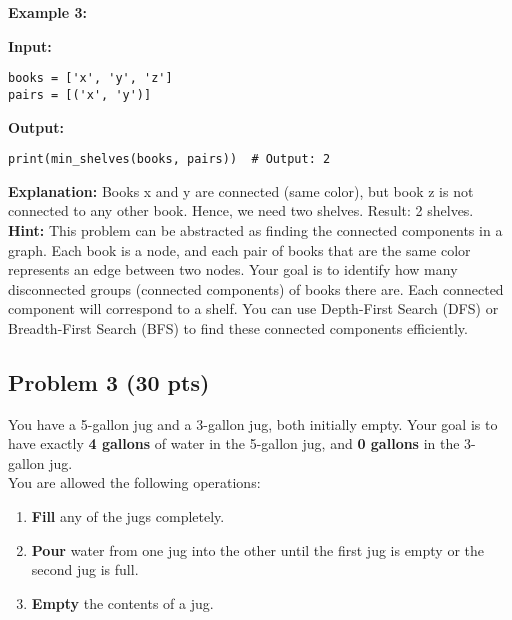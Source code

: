 \documentclass[12pt]{article}
\begin{document}
\vspace{1em}

\noindent \textbf{Example 3:}

\noindent \textbf{Input:}
\begin{verbatim}
books = ['x', 'y', 'z']
pairs = [('x', 'y')]
\end{verbatim}

\noindent \textbf{Output:}
\begin{verbatim}
print(min_shelves(books, pairs))  # Output: 2
\end{verbatim}

\noindent \textbf{Explanation:} Books x and y are connected (same color), but book z is not connected to any other book. Hence, we need two shelves. Result: 2 shelves.\\

\noindent \textbf{Hint:} This problem can be abstracted as finding the connected components in a graph. Each book is a node, and each pair of books that are the same color represents an edge between two nodes. Your goal is to identify how many disconnected groups (connected components) of books there are. Each connected component will correspond to a shelf. You can use Depth-First Search (DFS) or Breadth-First Search (BFS) to find these connected components efficiently.

\subsection*{Problem 3 (30 pts)}
You have a 5-gallon jug and a 3-gallon jug, both initially empty. Your goal is to have exactly \textbf{4 gallons} of water in the 5-gallon jug, and \textbf{0 gallons} in the 3-gallon jug.
\\

You are allowed the following operations:

\begin{enumerate}
    \item \textbf{Fill} any of the jugs completely.
    \item \textbf{Pour} water from one jug into the other until the first jug is empty or the second jug is full.
    \item \textbf{Empty} the contents of a jug.
\end{enumerate}
\end{document}
